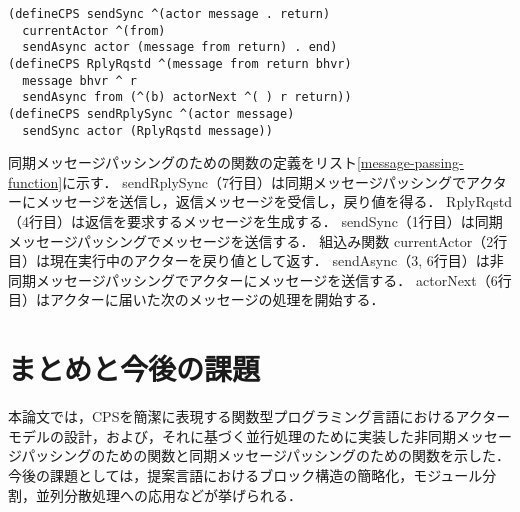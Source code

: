 \documentclass[10pt,a4j,twocolumn,oneside]{jsarticle}
\begin{document}
\begin{table}
\begin{lstlisting}[caption=同期メッセージパッシングのための関数,label=message-passing-function,frame=single,xleftmargin=2mm,xrightmargin=0mm]
(defineCPS sendSync ^(actor message . return)
  currentActor ^(from)
  sendAsync actor (message from return) . end)
(defineCPS RplyRqstd ^(message from return bhvr)
  message bhvr ^ r
  sendAsync from (^(b) actorNext ^( ) r return))
(defineCPS sendRplySync ^(actor message)
  sendSync actor (RplyRqstd message))
\end{lstlisting}
\end{table}

同期メッセージパッシングのための関数の定義をリスト\ref{message-passing-function}に示す．
sendRplySync（7行目）は同期メッセージパッシングでアクターにメッセージを送信し，返信メッセージを受信し，戻り値を得る．
RplyRqstd（4行目）は返信を要求するメッセージを生成する．
sendSync（1行目）は同期メッセージパッシングでメッセージを送信する．
組込み関数 currentActor（2行目）は現在実行中のアクターを戻り値として返す．
sendAsync（3, 6行目）は非同期メッセージパッシングでアクターにメッセージを送信する．
actorNext（6行目）はアクターに届いた次のメッセージの処理を開始する．

\section{まとめと今後の課題}

本論文では，CPSを簡潔に表現する関数型プログラミング言語におけるアクターモデルの設計，および，それに基づく並行処理のために実装した非同期メッセージパッシングのための関数と同期メッセージパッシングのための関数を示した．
今後の課題としては，提案言語におけるブロック構造の簡略化，モジュール分割，並列分散処理への応用などが挙げられる．

% 
% 

% 
% 
\small

\end{document}
